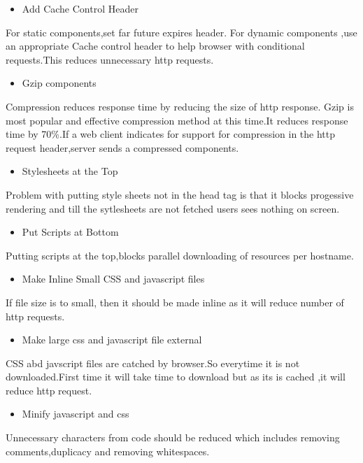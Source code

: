 \documentclass[11pt]{article}
\begin{document}
\begin{itemize}
\item Add Cache Control Header
\end{itemize}
For static components,set far future expires header.
For dynamic components ,use an appropriate Cache control header to help browser with conditional requests.This reduces unnecessary http requests.

\begin{itemize}
\item Gzip components
\end{itemize}
Compression reduces response time by reducing the size of http response.
Gzip is most popular and effective compression method at this time.It reduces response time by 70\%.If a web client indicates for support for compression in the http request header,server sends a compressed components.

\begin{itemize}
\item Stylesheets at the Top
\end{itemize}
Problem with putting style sheets not in the head tag is that it blocks progessive rendering and till the sytlesheets are not fetched users sees nothing on screen.

\begin{itemize}
\item Put Scripts at Bottom
\end{itemize}
Putting scripts at the top,blocks parallel downloading of resources per hostname.

\begin{itemize}
\item Make Inline Small CSS and javascript files
\end{itemize}
If file size is to small, then it should be made inline as it will reduce number of http requests.

\begin{itemize}
\item Make large css and javascript file external
\end{itemize}
CSS abd javscript files are catched by browser.So everytime it is not downloaded.First time it will take time to download but as its is cached ,it will reduce http request.

\begin{itemize}
\item Minify javascript and css
\end{itemize}
Unnecessary characters from code should be reduced which includes removing comments,duplicacy and removing whitespaces.
\end{document}
